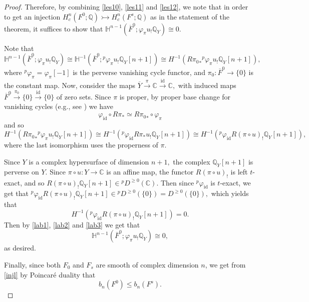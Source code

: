 \documentclass[12pt,leqno,twoside]{amsart}
\theoremstyle{remark}
\theoremstyle{remark}
\theoremstyle{definition}
\theoremstyle{remark}
\theoremstyle{remark}
\theoremstyle{remark}
\numberwithin{equation}{section}  %
\newcommand{\C}{\mathbb{C}}
\newcommand{\Q}{\mathbb{Q}}
\newcommand{\bH}{\mathbb{H}}
\begin{document}
\begin{proof}
Therefore, by combining \eqref{les10}, \eqref{les11} and \eqref{les12}, we note that in order to get an injection $H^n_c(F^0;\Q)  \rightarrowtail H^n_c(F^s;\Q)$ as in the statement of the theorem, it suffices to show that  $\bH^{n-1}(\overline{F}^0; \varphi_{\pi}u_{!}\Q_Y) \cong 0$.


Note that
\begin{equation}\label{lab1}
\bH^{n-1}(\overline{F}^0; \varphi_{\pi}u_{!}\Q_Y) \cong 
\mathbb{H}^{-1}(\overline{F}^0;{}^p\varphi_{\pi}u_{!}\mathbb{Q}_{Y}[n+1])
\cong H^{-1}(R{\pi_0}_*{}^p\varphi_{\pi}u_{!}\mathbb{Q}_{Y}[n+1]),
\end{equation}
where ${}^p\varphi_{\pi}=\varphi_{\pi}[-1]$ is the perverse vanishing cycle functor,  and $\pi_0\colon \overline{F}^0\rightarrow \{0\}$ is the constant map.
 Now, consider the maps $\overline{Y}\xrightarrow{\pi}\mathbb{C}\xrightarrow{\textrm{id}}\mathbb{C},$ with induced maps $\overline{F}^0\xrightarrow{\pi_0} \{0\}\xrightarrow{\textrm{id}} \{0\}$ of zero sets. Since $\pi$ is proper, by proper base change for vanishing cycles (e.g.,  see \cite[Rem.4.3.7]{Sch}) we have
\begin{equation}
    \varphi_{\textrm{id}}\circ R\pi_{*}\simeq R{\pi_{0}}_*\circ \varphi_{\pi}
\end{equation}
and so
\begin{equation}\label{lab2}
H^{-1}(R{\pi_0}_*{}^p\varphi_{\pi}u_{!}\mathbb{Q}_{Y}[n+1])\cong H^{-1}({}^p\varphi_{\textrm{id}} R\pi_{*}u_{!}\mathbb{Q}_{Y}[n+1]) \cong H^{-1}({}^p\varphi_{\textrm{id}}R(\pi \circ u)_{!}\mathbb{Q}_Y[n+1]),
\end{equation}
where the last isomorphism uses the properness of $\pi$. 

Since $Y$ is a complex hypersurface of dimension $n+1,$ the complex $\mathbb{Q}_Y[n+1]$ is perverse on $Y$. Since $\pi \circ u : Y \to \C$ 
is an affine map, the functor $R(\pi \circ u)_{!}$ is left $t$-exact, and so $R(\pi \circ u)_{!}\mathbb{Q}_Y[n+1]\in {}^p D^{\geq 0}(\mathbb{C}).$ Then since ${}^p\varphi_{\textrm{id}}$ is $t$-exact, we get that ${}^p\varphi_{\textrm{id}} R(\pi \circ u)_{!}\mathbb{Q}_Y[n+1]\in {}^pD^{\geq 0}(\{0\})=D^{\geq 0}(\{0\}),$ which yields that 
\begin{equation}\label{lab3}
    H^{-1}({}^p\varphi_{\textrm{id}}R(\pi \circ u)_{!}\mathbb{Q}_Y[n+1])=0.
\end{equation}
Then by \eqref{lab1},  \eqref{lab2} and \eqref{lab3} we get that
\begin{equation}
    \bH^{n-1}(\overline{F}^0; \varphi_{\pi}u_{!}\Q_Y) \cong 0,
\end{equation}
as desired.

Finally, since both $F_0$ and $F_{s}$ are smooth of complex dimension $n$, we get from \eqref{injl} by Poincar\'e duality that \[b_n(F^0) \leq b_n(F^{s}).\]
\end{proof}
\end{document}
